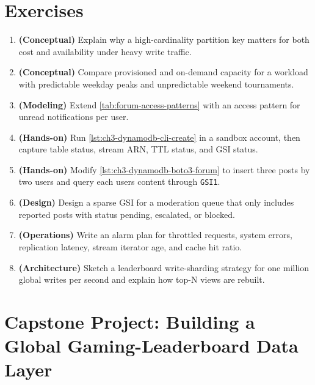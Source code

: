 \section{Exercises}
\begin{enumerate}
    \item \textbf{(Conceptual)} Explain why a high-cardinality partition key matters for both cost and availability under heavy write traffic.
    \item \textbf{(Conceptual)} Compare provisioned and on-demand capacity for a workload with predictable weekday peaks and unpredictable weekend tournaments.
    \item \textbf{(Modeling)} Extend \cref{tab:forum-access-patterns} with an access pattern for unread notifications per user.
    \item \textbf{(Hands-on)} Run \cref{lst:ch3-dynamodb-cli-create} in a sandbox account, then capture table status, stream ARN, TTL status, and GSI status.
    \item \textbf{(Hands-on)} Modify \cref{lst:ch3-dynamodb-boto3-forum} to insert three posts by two users and query each user\textquotesingle{}s content through \texttt{GSI1}.
    \item \textbf{(Design)} Design a sparse GSI for a moderation queue that only includes reported posts with status pending, escalated, or blocked.
    \item \textbf{(Operations)} Write an alarm plan for throttled requests, system errors, replication latency, stream iterator age, and cache hit ratio.
    \item \textbf{(Architecture)} Sketch a leaderboard write-sharding strategy for one million global writes per second and explain how top-N views are rebuilt.
\end{enumerate}

\section{Capstone Project: Building a Global Gaming-Leaderboard Data Layer}\label{sec:ch3-capstone}

